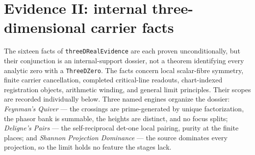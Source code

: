 \documentclass[11pt]{article}
\theoremstyle{definition}
\begin{document}
\section{Evidence II: internal three-dimensional carrier facts}
\label{sec:grh-E2}

The sixteen facts of \texttt{threeDRealEvidence} are each proven
unconditionally, but their conjunction is an internal-support dossier, not a
theorem identifying every analytic zero with a \texttt{ThreeDZero}.  The
facts concern local scalar-fibre symmetry, finite carrier cancellation,
completed critical-line readouts, chart-indexed registration objects,
arithmetic winding, and general limit principles.  Their scopes are recorded
individually below.  Three named engines organize the dossier:
\emph{Feynman's Quiver} --- the crossings are prime-generated by unique factorization, the
phasor bank is summable, the heights are distinct, and no focus splits; \emph{Deligne's
Pairs} --- the self-reciprocal det-one local pairing, purity at the finite places; and
\emph{Shannon Projection Dominance} --- the source dominates every projection, so the limit
holds no feature the stages lack.
\end{document}
